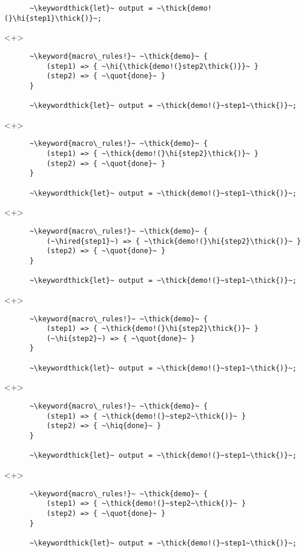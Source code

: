 \documentclass[usepdftitle=false,aspectratio=169]{beamer}
\newcommand{\thick}[1]{\contourlength{0.16pt}\contour[10]{black}{#1}}
\newcommand{\slantbox}[2][.5]
  {%
    \mbox
      {%
        \sbox{\foobox}{#2}%
        \hskip\wd\foobox
        \pdfsave
        \pdfsetmatrix{1 0 #1 1}%
        \llap{\usebox{\foobox}}%
        \pdfrestore
      }%
  }
\newcommand{\backslantbox}[2][.5]
  {%
    \mbox
      {%
        \sbox{\foobox}{#2}%
        \hskip\wd\foobox
        \pdfsave
        \pdfsetmatrix{-1 0 #1 1}%
        \llap{\usebox{\foobox}}%
        \pdfrestore
      }%
  }
\newcommand{\hi}[1]{%
\tikz[baseline=(A.base)]
 \node[highlighting=yellowbg,inner sep=0pt,text depth=0pt] (A) {#1};%
}
\newcommand{\hired}[1]{%
\tikz[baseline=(A.base)]
 \node[highlighting=redish!50,inner sep=0pt,text depth=0pt] (A) {#1};%
}
\newcommand{\openquote}{\backslantbox[.2]{\hspace{11pt}''\hspace{-11pt}}}
\newcommand{\closequote}{\slantbox[-.2]{\hspace{2pt}''\hspace{-2pt}}}
\newcommand{\hiq}[1]{\hi{\openquote#1\closequote}}
\newcommand{\blackquote}[1]{\openquote#1\closequote}
\newcommand{\quot}[1]{{\color{redish}\blackquote{#1}}}
\newcommand{\keyword}[1]{\color{greenish}#1}
\newcommand{\keywordthick}[1]{\color{greenish}\contourlength{0.20pt}\contour[10]{greenish}{#1}}
\begin{document}
\begin{frame}[fragile]
\begin{onlyenv}
\begin{verbatim}
      ~\keywordthick{let}~ output = ~\thick{demo!(}\hi{step1}\thick{)}~;
    \end{verbatim}
  \end{onlyenv}
  \begin{onlyenv}<+>
    \begin{verbatim}
      ~\keyword{macro\_rules!}~ ~\thick{demo}~ {
          (step1) => { ~\hi{\thick{demo!(}step2\thick{)}}~ }
          (step2) => { ~\quot{done}~ }
      }

      ~\keywordthick{let}~ output = ~\thick{demo!(}~step1~\thick{)}~;
    \end{verbatim}
  \end{onlyenv}
  \begin{onlyenv}<+>
    \begin{verbatim}
      ~\keyword{macro\_rules!}~ ~\thick{demo}~ {
          (step1) => { ~\thick{demo!(}\hi{step2}\thick{)}~ }
          (step2) => { ~\quot{done}~ }
      }

      ~\keywordthick{let}~ output = ~\thick{demo!(}~step1~\thick{)}~;
    \end{verbatim}
  \end{onlyenv}
  \begin{onlyenv}<+>
    \begin{verbatim}
      ~\keyword{macro\_rules!}~ ~\thick{demo}~ {
          (~\hired{step1}~) => { ~\thick{demo!(}\hi{step2}\thick{)}~ }
          (step2) => { ~\quot{done}~ }
      }

      ~\keywordthick{let}~ output = ~\thick{demo!(}~step1~\thick{)}~;
    \end{verbatim}
  \end{onlyenv}
  \begin{onlyenv}<+>
    \begin{verbatim}
      ~\keyword{macro\_rules!}~ ~\thick{demo}~ {
          (step1) => { ~\thick{demo!(}\hi{step2}\thick{)}~ }
          (~\hi{step2}~) => { ~\quot{done}~ }
      }

      ~\keywordthick{let}~ output = ~\thick{demo!(}~step1~\thick{)}~;
    \end{verbatim}
  \end{onlyenv}
  \begin{onlyenv}<+>
    \begin{verbatim}
      ~\keyword{macro\_rules!}~ ~\thick{demo}~ {
          (step1) => { ~\thick{demo!(}~step2~\thick{)}~ }
          (step2) => { ~\hiq{done}~ }
      }

      ~\keywordthick{let}~ output = ~\thick{demo!(}~step1~\thick{)}~;
    \end{verbatim}
  \end{onlyenv}
  \begin{onlyenv}<+>
    \begin{verbatim}
      ~\keyword{macro\_rules!}~ ~\thick{demo}~ {
          (step1) => { ~\thick{demo!(}~step2~\thick{)}~ }
          (step2) => { ~\quot{done}~ }
      }

      ~\keywordthick{let}~ output = ~\thick{demo!(}~step1~\thick{)}~;
    \end{verbatim}
  \end{onlyenv}
\end{frame}
\end{document}
